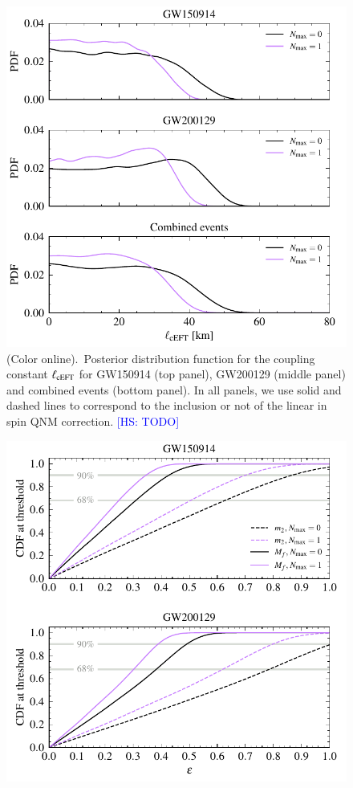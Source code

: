 \documentclass[twocolumn,
               prd,
               aps,
               superscriptaddress,
               tightenlines,
               nofootinbib,
               eqsecnum,
               amsfonts,
               amsmath,
               longbibliography]{revtex4-1}
\newcommand{\hs}[1]{{\textcolor{blue}{{[HS: #1]}} }}
\begin{document}
\begin{figure}[t]
\includegraphics[width=\columnwidth]{figs/ceft_posteriors_combined.pdf}
\caption{(Color online).~Posterior distribution function for the coupling constant $\ell_{\rm cEFT}$ for
GW150914 (top panel), GW200129 (middle panel) and combined events (bottom panel).
%
In all panels, we use solid and dashed lines to correspond to the inclusion or not of the linear
in spin QNM correction.
%
\hs{TODO}
}
\label{fig:cEFT_exec_sum}
\end{figure}

\begin{figure}[t]
\includegraphics[width=\columnwidth]{figs/ceft_cdf_varying_threshold.pdf}
\caption{
}
\label{fig:cEFT_cdf}
\end{figure}
\end{document}
